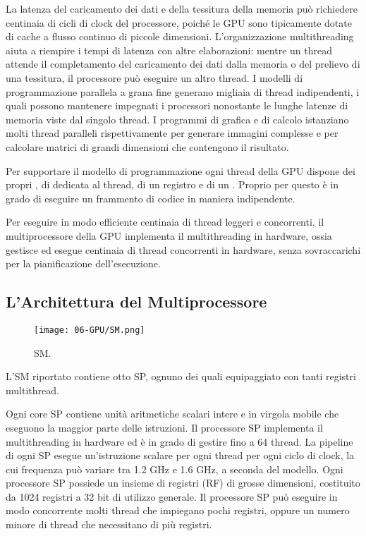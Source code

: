 La latenza del caricamento dei dati e della tessitura della memoria può richiedere centinaia di cicli di clock del processore, poiché le GPU sono tipicamente dotate di cache a flusso continuo di piccole dimensioni. L'organizzazione multithreading aiuta a riempire i tempi di latenza con altre elaborazioni: mentre un thread attende il completamento del caricamento dei dati dalla memoria o del prelievo di una tessitura, il processore può eseguire un altro thread. I modelli di programmazione parallela a grana fine generano migliaia di thread indipendenti, i quali possono mantenere impegnati i processori nonostante le lunghe latenze di memoria viste dal singolo thread. I programmi di grafica e di calcolo istanziano molti thread paralleli rispettivamente per generare immagini complesse e per calcolare matrici di grandi dimensioni che contengono il risultato. 

Per supportare il modello di programmazione ogni thread della GPU dispone dei propri , di  dedicata al thread, di un registro   e di un . Proprio per questo è in grado di eseguire un frammento di codice in maniera indipendente. 

Per eseguire in modo efficiente centinaia di thread leggeri e concorrenti, il multiprocessore della GPU implementa il multithreading in hardware, ossia gestisce ed esegue centinaia di thread concorrenti in hardware, senza sovraccarichi per la pianificazione dell'esecuzione.

\subsection{L'Architettura del Multiprocessore}

\begin{figure}[h]
    \centering
    \texttt{[image: 06-GPU/SM.png]}
    \caption{SM.}
\end{figure}

L'SM riportato contiene otto SP, ognuno dei quali equipaggiato con tanti registri multithread. 

Ogni core SP contiene unità aritmetiche scalari intere e in virgola mobile che eseguono la maggior parte delle istruzioni. Il processore SP implementa il multithreading in hardware ed è in grado di gestire fino a 64 thread. La pipeline di ogni SP esegue un'istruzione scalare per ogni thread per ogni ciclo di clock, la cui frequenza può variare tra 1.2 GHz e 1.6 GHz, a seconda del modello. Ogni processore SP possiede un insieme di registri (RF) di grosse dimensioni, costituito da 1024 registri a 32 bit di utilizzo generale. Il processore SP può eseguire in modo concorrente molti thread che impiegano pochi registri, oppure un numero minore di thread che necessitano di più registri. 

